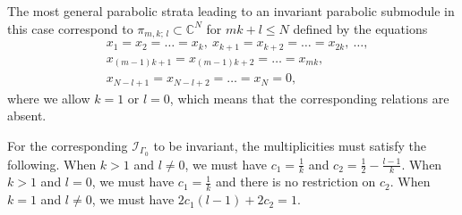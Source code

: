 \documentclass[12pt]{amsart}
\numberwithin{equation}{section}
\theoremstyle{definition}
\begin{document}
The most general parabolic strata leading to an invariant parabolic submodule in this case correspond to $\pi_{m,k;\, l} \subset \mathbb{C}^N$ for $mk+l \leq N$ defined by the equations
\begin{align*}
    &x_1 = x_2 = \dots = x_k, \ x_{k+1} = x_{k + 2} = \dots = x_{2k}, \ \dots, \\
    &x_{(m-1)k+1} = x_{(m-1)k+2} = \dots = x_{mk}, \\
    &x_{N - l + 1} = x_{N - l + 2} = \dots = x_{N} = 0,    
\end{align*}
where we allow $k=1$ or $l=0$, which means that the corresponding relations are absent.

For the corresponding $\mathcal{I}_{\Gamma_0}$ to be invariant,
the multiplicities must satisfy the following. When $k > 1$ and $l \neq 0$, we must have $c_1 = \frac{1}{k}$ and $c_2 = \frac{1}{2} - \frac{l - 1}{k}$. When $k > 1$ and $l = 0$, we must have $c_1 = \frac{1}{k}$ and there is no restriction on $c_2$. When $k = 1$ and $l \neq 0$, we must have $2c_1(l-1) + 2c_2 = 1$.


\end{document}
